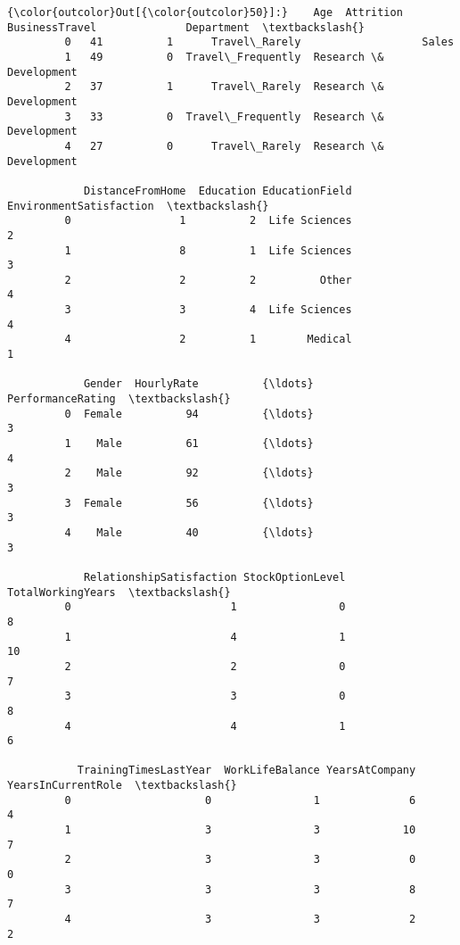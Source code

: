 \documentclass[11pt]{article}
\begin{document}
\begin{Verbatim}[commandchars=\\\{\}]
{\color{outcolor}Out[{\color{outcolor}50}]:}    Age  Attrition     BusinessTravel              Department  \textbackslash{}
         0   41          1      Travel\_Rarely                   Sales   
         1   49          0  Travel\_Frequently  Research \& Development   
         2   37          1      Travel\_Rarely  Research \& Development   
         3   33          0  Travel\_Frequently  Research \& Development   
         4   27          0      Travel\_Rarely  Research \& Development   
         
            DistanceFromHome  Education EducationField  EnvironmentSatisfaction  \textbackslash{}
         0                 1          2  Life Sciences                        2   
         1                 8          1  Life Sciences                        3   
         2                 2          2          Other                        4   
         3                 3          4  Life Sciences                        4   
         4                 2          1        Medical                        1   
         
            Gender  HourlyRate          {\ldots}           PerformanceRating  \textbackslash{}
         0  Female          94          {\ldots}                           3   
         1    Male          61          {\ldots}                           4   
         2    Male          92          {\ldots}                           3   
         3  Female          56          {\ldots}                           3   
         4    Male          40          {\ldots}                           3   
         
            RelationshipSatisfaction StockOptionLevel  TotalWorkingYears  \textbackslash{}
         0                         1                0                  8   
         1                         4                1                 10   
         2                         2                0                  7   
         3                         3                0                  8   
         4                         4                1                  6   
         
           TrainingTimesLastYear  WorkLifeBalance YearsAtCompany  YearsInCurrentRole  \textbackslash{}
         0                     0                1              6                   4   
         1                     3                3             10                   7   
         2                     3                3              0                   0   
         3                     3                3              8                   7   
         4                     3                3              2                   2   
         

\end{Verbatim}
\end{document}
